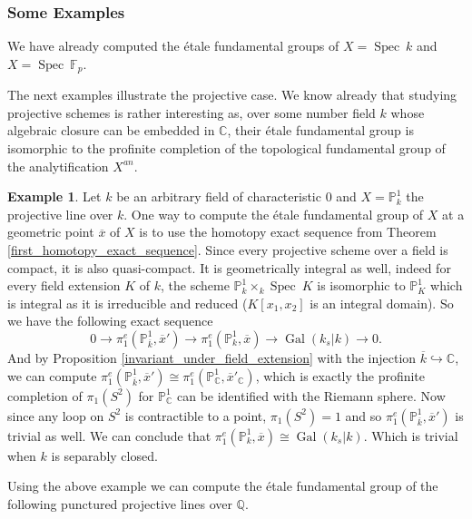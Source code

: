 \documentclass{article}
\theoremstyle{plain}
\theoremstyle{definition}
\newtheorem{example}[theorem]{Example}
\DeclareMathOperator{\Spec}{Spec}
\DeclareMathOperator{\Gal}{Gal}
\begin{document}
\subsubsection{Some Examples}

We have already computed the \'etale fundamental groups of $X = \Spec\: k$ and $X = \Spec\: \mathbb{F}_p$.

\noindent The next examples illustrate the projective case. 
We know already that studying projective schemes is rather interesting as, over some number field $k$ whose algebraic closure can be embedded in $\mathbb{C}$,  their \'etale fundamental group is isomorphic to the profinite completion of the topological fundamental group of the analytification $X^{an}$. 

\begin{example}
    Let $k$ be an arbitrary field of characteristic $0$ and $X = \mathbb{P}^1_k$ the projective line over $k$.
    One way to compute the \'etale fundamental group of $X$ at a geometric point $\overline{x}$ of $X$ is to use the homotopy exact sequence from Theorem \ref{first_homotopy_exact_sequence}.
    Since every projective scheme over a field is compact, it is also quasi-compact.
    It is geometrically integral as well, indeed for every field extension $K$ of $k$, the scheme $\mathbb{P}^1_k\times_k\Spec\:K$ is isomorphic to $\mathbb{P}^1_K$ which is integral as it is irreducible and reduced ($K[x_1,x_2]$ is an integral domain).
    So we have the following exact sequence 
    $$0\rightarrow \pi^e_1(\mathbb{P}^1_{\overline{k}}, \overline{x}') \rightarrow \pi^e_1(\mathbb{P}^1_{k}, \overline{x}) \rightarrow \Gal(k_s|k) \rightarrow 0.$$
    And by Proposition \ref{invariant_under_field_extension} with the injection $\overline{k}\hookrightarrow \mathbb{C}$, we can compute $\pi^e_1(\mathbb{P}^1_{\overline{k}}, \overline{x}') \cong \pi^e_1(\mathbb{P}^1_{\mathbb{C}}, \overline{x}'_{\mathbb{C}})$, which is exactly the profinite completion of $\pi_1(S^2)$ for $\mathbb{P}^1_{\mathbb{C}}$ can be identified with the Riemann sphere.
    Now since any loop on $S^2$ is contractible to a point, $\pi_1(S^2) = 1$ and so $\pi^e_1(\mathbb{P}^1_{\overline{k}}, \overline{x}')$ is trivial as well.
    We can conclude that $\pi^e_1(\mathbb{P}^1_{k}, \overline{x}) \cong \Gal(k_s|k)$. 
    Which is trivial when $k$ is separably closed.
\end{example}


\noindent Using the above example we can compute the \'etale fundamental group of the following punctured projective lines over $\mathbb{Q}$.
\end{document}
